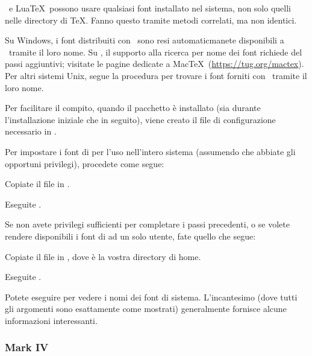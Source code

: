 \documentclass{article}
\begin{document}
\XeTeX\ e Lua\TeX\ possono usare qualsiasi font installato nel sistema,
non solo quelli nelle directory di \TeX. Fanno questo tramite metodi
correlati, ma non identici.

Su Windows, i font distribuiti con \TL\ sono resi automaticmanete
disponibili a \XeTeX\ tramite il loro nome. Su \MacOSX, il supporto
alla ricerca per nome dei font richiede del passi aggiuntivi; visitate
le pagine dedicate a Mac\TeX\ (\url{https://tug.org/mactex}). Per
altri sistemi Unix, segue la procedura per trovare i font forniti con
\TL\ tramite il loro nome.

Per facilitare il compito, quando il pacchetto  è
installato (sia durante l'installazione iniziale che in seguito), viene 
creato il file di configurazione necessario in
.

Per impostare i font di \TL{} per l'uso nell'intero sistema (assumendo che
abbiate gli opportuni privilegi), procedete come segue:
\begin{enumerate*}
\item Copiate il file  in
  .

\item Eseguite .
\end{enumerate*}

Se non avete privilegi sufficienti per completare i passi precedenti,
o se volete rendere disponibili i font di \TL{} ad un
solo utente, fate quello che segue:
\begin{enumerate*}
\item Copiate il file  in
  , dove \filename{~} è la vostra directory di
  home.

\item Eseguite .
\end{enumerate*}

Potete eseguire  per vedere i nomi dei font di sistema.
L'incantesimo  (dove tutti gli
argomenti sono esattamente come mostrati) generalmente fornisce alcune
informazioni interessanti.


\subsubsection{\protect\ConTeXt{} Mark IV}
\label{sec:context-mkiv}
\end{document}

